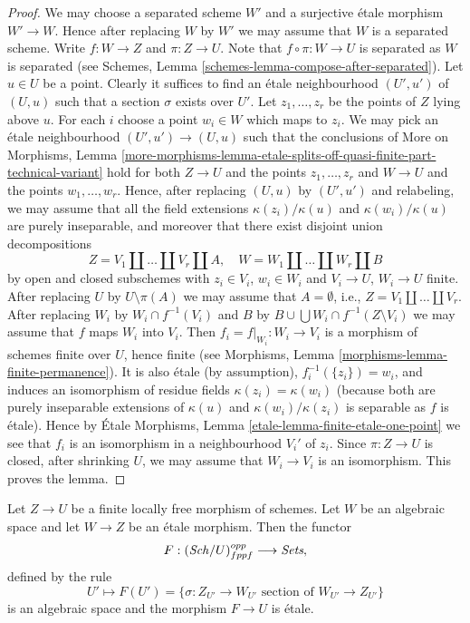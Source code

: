\begin{proof}
We may choose a separated scheme $W'$ and a surjective \'etale morphism
$W' \to W$. Hence after replacing $W$ by $W'$ we may assume that $W$
is a separated scheme. Write $f : W \to Z$ and $\pi : Z \to U$.
Note that $f \circ \pi : W \to U$ is separated as
$W$ is separated (see
Schemes, Lemma \ref{schemes-lemma-compose-after-separated}).
Let $u \in U$ be a point. Clearly it suffices
to find an \'etale neighbourhood $(U', u')$ of $(U, u)$ such that
a section $\sigma$ exists over $U'$. Let $z_1, \ldots, z_r$
be the points of $Z$ lying above $u$. For each $i$ choose a point
$w_i \in W$ which maps to $z_i$. We may pick an \'etale neighbourhood
$(U', u') \to (U, u)$ such that the conclusions of
More on Morphisms, Lemma
\ref{more-morphisms-lemma-etale-splits-off-quasi-finite-part-technical-variant}
hold for both $Z \to U$ and the points $z_1, \ldots, z_r$
and $W \to U$ and the points $w_1, \ldots, w_r$. Hence, after
replacing $(U, u)$ by $(U', u')$ and relabeling, we may assume that
all the field extensions $\kappa(z_i)/\kappa(u)$ and
$\kappa(w_i)/\kappa(u)$ are purely inseparable, and moreover
that there exist disjoint union decompositions
$$
Z = V_1 \amalg \ldots \amalg V_r \amalg A, \quad
W = W_1 \amalg \ldots \amalg W_r \amalg B
$$
by open and closed subschemes
with $z_i \in V_i$, $w_i \in W_i$ and $V_i \to U$, $W_i \to U$ finite.
After replacing $U$ by $U \setminus \pi(A)$ we may assume that
$A = \emptyset$, i.e., $Z = V_1 \amalg \ldots \amalg V_r$.
After replacing $W_i$ by $W_i \cap f^{-1}(V_i)$ and
$B$ by $B \cup \bigcup W_i \cap f^{-1}(Z \setminus V_i)$
we may assume that $f$ maps $W_i$ into $V_i$.
Then $f_i = f|_{W_i} : W_i \to V_i$ is a morphism of schemes finite over $U$,
hence finite (see
Morphisms, Lemma \ref{morphisms-lemma-finite-permanence}).
It is also \'etale (by assumption),
$f_i^{-1}(\{z_i\}) = w_i$, and induces an isomorphism of residue
fields $\kappa(z_i) = \kappa(w_i)$ (because both are purely inseparable
extensions of $\kappa(u)$ and $\kappa(w_i)/\kappa(z_i)$
is separable as $f$ is \'etale). Hence by
\'Etale Morphisms, Lemma \ref{etale-lemma-finite-etale-one-point}
we see that $f_i$ is an isomorphism in a neighbourhood $V_i'$ of
$z_i$. Since $\pi : Z \to U$ is closed, after shrinking $U$, we may assume
that $W_i \to V_i$ is an isomorphism. This proves the lemma.
\end{proof}

\begin{lemma}
\label{lemma-space-of-sections}
Let $Z \to U$ be a finite locally free morphism of schemes.
Let $W$ be an algebraic space and let $W \to Z$ be an \'etale morphism.
Then the functor
$$
F : (\mathit{Sch}/U)_{fppf}^{opp} \longrightarrow \textit{Sets},
$$
defined by the rule
$$
U' \longmapsto
F(U') =
\{\sigma : Z_{U'} \to W_{U'}\text{ section of }W_{U'} \to Z_{U'}\}
$$
is an algebraic space and the morphism $F \to U$ is \'etale.
\end{lemma}

